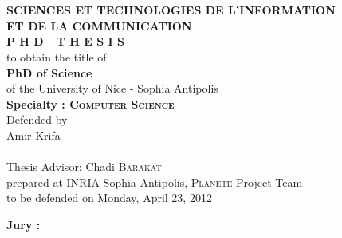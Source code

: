 \begin{titlepage}
\begin{center}
 \\
\vspace*{0.3cm}
 \\
\noindent \textbf{SCIENCES ET TECHNOLOGIES DE L'INFORMATION \\ ET DE LA COMMUNICATION} \\
\vspace*{0.5cm}
\noindent \Huge \textbf{P H D\ \ T H E S I S} \\
\vspace*{0.3cm}
\noindent \large {to obtain the title of} \\
\vspace*{0.3cm}
\noindent \LARGE \textbf{PhD of Science} \\
\vspace*{0.3cm}
\noindent \Large of the University of Nice - Sophia Antipolis \\
\noindent \Large \textbf{Specialty : \textsc{Computer Science}}\\
\vspace*{0.4cm}
\noindent \large {Defended by\\}
\noindent \LARGE Amir Krifa \\
\vspace*{0.8cm}
 \\
\vspace*{0.8cm}
\noindent \Large Thesis Advisor: Chadi \textsc{Barakat} \\
\vspace*{0.2cm}
\noindent \Large prepared at INRIA Sophia Antipolis, \textsc{Planete} Project-Team\\
\vspace*{0.2cm}
\noindent \large to be defended on Monday, April 23, 2012 \\
\vspace*{0.5cm}
\end{center}
\noindent \large \textbf{Jury :} \\
\begin{center}
\noindent \large 
\begin{tabular}{llcl}

\end{tabular}
\end{center}
\end{titlepage}
